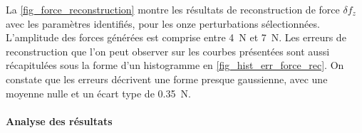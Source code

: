 \documentclass[12pt, a4paper]{article} %
\numberwithin{equation}{section}
\begin{document}
%
\newlineBlank
% 
La \cref{fig_force_reconstruction} montre les résultats de reconstruction de force $ \delta f_z $ avec les paramètres identifiés, pour les onze perturbations sélectionnées. L'amplitude des forces générées est comprise entre \SI{4}{\newton} et \SI{7}{\newton}. Les erreurs de reconstruction que l'on peut observer sur les courbes présentées sont aussi récapitulées sous la forme d'un histogramme en \cref{fig_hist_err_force_rec}. On constate que les erreurs décrivent une forme presque gaussienne, avec une moyenne nulle %
et un écart type de \SI{0.35}{\newton}.
%
 
%


\paragraph{Analyse des résultats}
\end{document}

